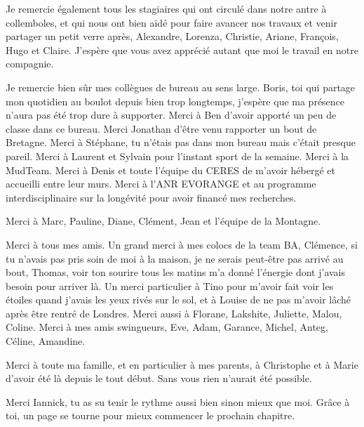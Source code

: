 Je remercie également tous les stagiaires qui ont circulé dans notre antre à
collemboles, et qui nous ont bien aidé pour faire avancer nos travaux et venir
partager un petit verre après, Alexandre, Lorenza, Christie, Ariane, François,
Hugo et Claire. J’espère que vous avez apprécié autant que moi le travail en
notre compagnie.

Je remercie bien sûr mes collègues de bureau au sens large. Boris, toi qui
partage mon quotidien au boulot depuis bien trop longtemps, j’espère que ma
présence n’aura pas été trop dure à supporter. Merci à Ben d’avoir apporté un
peu de classe dans ce bureau. Merci Jonathan d’être venu rapporter un bout de
Bretagne. Merci à Stéphane, tu n’étais pas dans mon bureau mais c’était presque
pareil. Merci à Laurent et Sylvain pour l’instant sport de la semaine. Merci à
la MudTeam. Merci à Denis et toute l’équipe du CERES de m’avoir hébergé et
accueilli entre leur murs. Merci à l’ANR EVORANGE et au programme
interdisciplinaire sur la longévité pour avoir financé mes recherches.

Merci à Marc, Pauline, Diane, Clément, Jean et l’équipe de la Montagne.

Merci à tous mes amis. Un grand merci à mes colocs de la team BA, Clémence, si
tu n’avais pas pris soin de moi à la maison, je ne serais peut-être pas arrivé
au bout, Thomas, voir ton sourire tous les matins m’a donné l’énergie dont
j’avais besoin pour arriver là. Un merci particulier à Tino pour m’avoir fait
voir les étoiles quand j’avais les yeux rivés sur le sol, et à Louise de ne pas
m’avoir lâché après être rentré de Londres. Merci aussi à Florane, Lakshite,
Juliette, Malou, Coline. Merci à mes amis swingueurs, Eve, Adam, Garance,
Michel, Anteg, Céline, Amandine.

Merci à toute ma famille, et en particulier à mes parents, à Christophe et à
Marie d’avoir été là depuis le tout début. Sans vous rien n’aurait été possible.

Merci Iannick, tu as su tenir le rythme aussi bien sinon mieux que moi. Grâce à
toi, un page se tourne pour mieux commencer le prochain chapitre.


